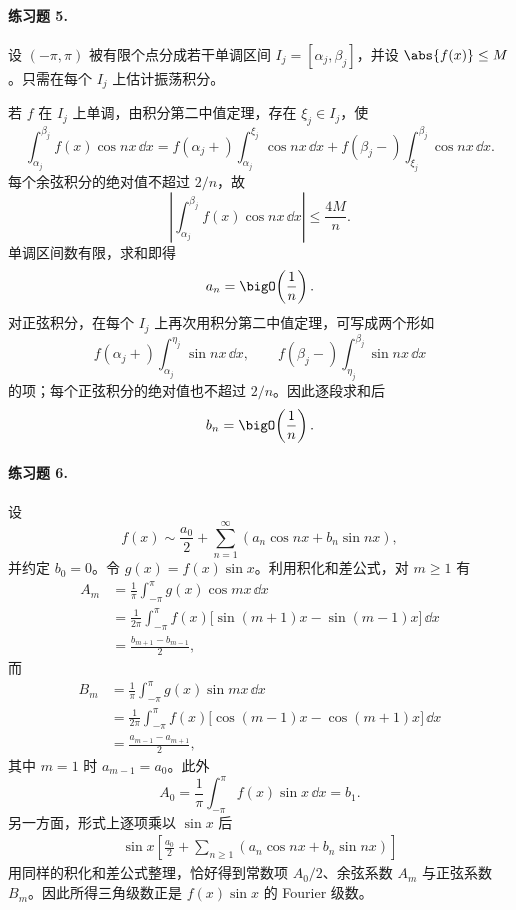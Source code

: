 \paragraph{练习题 5.}
\begin{xsolution}
设 $(-\pi,\pi)$ 被有限个点分成若干单调区间 $I_j=[\alpha_j,\beta_j]$，并设
$\abs{f(x)}\le M$。只需在每个 $I_j$ 上估计振荡积分。

若 $f$ 在 $I_j$ 上单调，由积分第二中值定理，存在 $\xi_j\in I_j$，使
\[
  \int_{\alpha_j}^{\beta_j}f(x)\cos nx\,\dd x
  =f(\alpha_j+)\int_{\alpha_j}^{\xi_j}\cos nx\,\dd x
   +f(\beta_j-)\int_{\xi_j}^{\beta_j}\cos nx\,\dd x.
\]
每个余弦积分的绝对值不超过 $2/n$，故
\[
  \left|\int_{\alpha_j}^{\beta_j}f(x)\cos nx\,\dd x\right|
  \le\frac{4M}{n}.
\]
单调区间数有限，求和即得
\[
  a_n=\bigO\!\left(\frac1n\right).
\]
对正弦积分，在每个 $I_j$ 上再次用积分第二中值定理，可写成两个形如
\[
  f(\alpha_j+)\int_{\alpha_j}^{\eta_j}\sin nx\,\dd x,
  \qquad
  f(\beta_j-)\int_{\eta_j}^{\beta_j}\sin nx\,\dd x
\]
的项；每个正弦积分的绝对值也不超过 $2/n$。因此逐段求和后
\[
  b_n=\bigO\!\left(\frac1n\right).
\]
\end{xsolution}

\paragraph{练习题 6.}
\begin{xsolution}
设
\[
  f(x)\sim\frac{a_0}{2}+\sum_{n=1}^{\infty}(a_n\cos nx+b_n\sin nx),
\]
并约定 $b_0=0$。令 $g(x)=f(x)\sin x$。利用积化和差公式，对 $m\ge1$ 有
\begin{align*}
  A_m
  &=\frac1\pi\int_{-\pi}^{\pi}g(x)\cos mx\,\dd x\\
  &=\frac1{2\pi}\int_{-\pi}^{\pi}f(x)
    \bigl[\sin(m+1)x-\sin(m-1)x\bigr]\,\dd x\\
  &=\frac{b_{m+1}-b_{m-1}}2,
\end{align*}
而
\begin{align*}
  B_m
  &=\frac1\pi\int_{-\pi}^{\pi}g(x)\sin mx\,\dd x\\
  &=\frac1{2\pi}\int_{-\pi}^{\pi}f(x)
    \bigl[\cos(m-1)x-\cos(m+1)x\bigr]\,\dd x\\
  &=\frac{a_{m-1}-a_{m+1}}2,
\end{align*}
其中 $m=1$ 时 $a_{m-1}=a_0$。此外
\[
  A_0=\frac1\pi\int_{-\pi}^{\pi}f(x)\sin x\,\dd x=b_1.
\]
另一方面，形式上逐项乘以 $\sin x$ 后
\begin{align*}
  \sin x\left[\frac{a_0}{2}+\sum_{n\ge1}(a_n\cos nx+b_n\sin nx)\right]
\end{align*}
用同样的积化和差公式整理，恰好得到常数项 $A_0/2$、余弦系数 $A_m$ 与正弦系数 $B_m$。因此所得三角级数正是 $f(x)\sin x$ 的 Fourier 级数。
\end{xsolution}

